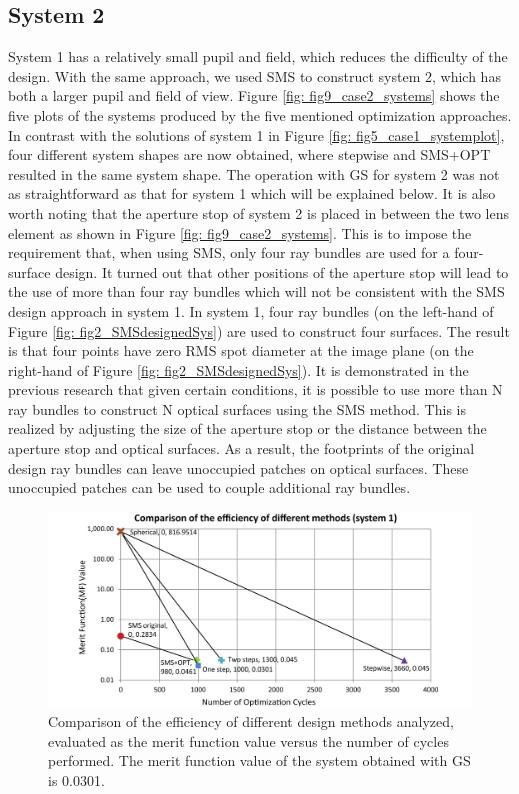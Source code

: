 \subsection{System 2}
System 1 has a relatively small pupil and field, which reduces the difficulty of the design. With the same approach, we used SMS to construct system 2, which has both a larger pupil and field of view. Figure \ref{fig: fig9_case2_systems} shows the five plots of the systems produced by the five mentioned optimization approaches. In contrast with the solutions of system 1 in Figure \ref{fig: fig5_case1_systemplot}, four different system shapes are now obtained, where stepwise and SMS+OPT resulted in the same system shape. The operation with GS for system 2 was not as straightforward as that for system 1 which will be explained below. It is also worth noting that the aperture stop of system 2 is placed in between the two lens element as shown in Figure \ref{fig: fig9_case2_systems}. This is to impose the requirement that, when using SMS, only four ray bundles are used for a four-surface design. It turned out that other positions of the aperture stop will lead to the use of more than four ray bundles which will not be consistent with the SMS design approach in system 1. In system 1, four ray bundles (on the left-hand of  Figure \ref{fig: fig2_SMSdesignedSys}) are used to construct four surfaces. The result is that four points have zero RMS spot diameter at the image plane (on the right-hand of Figure \ref{fig: fig2_SMSdesignedSys}). It is demonstrated in the previous research \cite{BenitezSPIE2014}\cite{FDuerrOE2013}\cite{FDuerrOE12} that given certain conditions, it is possible to use more than N ray bundles to construct N optical surfaces using the SMS method. This is realized by adjusting the size of the aperture stop or the distance between the aperture stop and optical surfaces. As a result, the footprints of the original design ray bundles can leave unoccupied patches on optical surfaces. These unoccupied patches can be used to couple additional ray bundles.   

\begin{figure}[h!]
    \centering
    \includegraphics[width=1\textwidth]{chapter-5/figures/Figure8_OE340147.png}
    \caption{Comparison of the efficiency of different design methods analyzed, evaluated as the merit function value versus the number of cycles performed. The merit function value of the system obtained with GS is 0.0301.}
    \label{fig: fig8_case1_efficiencyCompare}
\end{figure}

